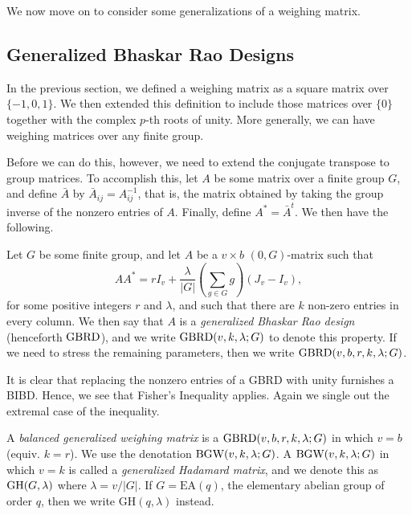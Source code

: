 \documentclass[../../../main]{subfiles}
\begin{document}
We now move on to consider some generalizations of a weighing matrix.

\dinkus


\subsection{Generalized Bhaskar Rao Designs}

In the previous section, we defined a weighing matrix as a square matrix over $\{-1,0,1\}$. We then extended this definition to include those matrices over $\{0\}$ together with the complex $p$-th roots of unity. More generally, we can have weighing matrices over any finite group. 

Before we can do this, however, we need to extend the conjugate transpose to group matrices. To accomplish this, let $A$ be some matrix over a finite group $G$, and define $\bar A$ by $\bar{A}_{ij}=A_{ij}^{-1}$, that is, the matrix obtained by taking the group inverse of the nonzero entries of $A$. Finally, define $A^* = \bar{A}^t$. We then have the following.

\begin{defin}\label{gbrd definition}
  Let $G$ be some finite group, and let $A$ be a $v \times b$ $(0,G)$-matrix such that
  \begin{equation}\label{gbrd-eq}
    AA^* = rI_v + \frac{\lambda}{|G|}\left(\sum_{g \in G}g\right)(J_v - I_v),
  \end{equation}
  for some positive integers $r$ and $\lambda$, and such that there are $k$ non-zero entries in every column. We then say that $A$ is a {\it generalized Bhaskar Rao design} (henceforth $\text{GBRD}$), and we write $\text{GBRD}(v,k,\lambda;G)$ to denote this property. If we need to stress the remaining parameters, then we write $\text{GBRD}(v,b,r,k,\lambda;G)$.
\end{defin}

It is clear that replacing the nonzero entries of a GBRD with unity furnishes a
BIBD. Hence, we see that Fisher's Inequality applies. Again we single out the
extremal case of the inequality.

\begin{defin}\label{bgw definition}
  A {\it balanced generalized weighing matrix} is a $\text{GBRD}(v,b,r,k,\lambda;G)$
  in which $v = b$ (equiv. $k = r$). We use the denotation
  $\text{BGW}(v,k,\lambda;G)$. A $\text{BGW}(v,k,\lambda;G)$ in which $v = k$ is called a
  {\it generalized Hadamard matrix}, and we denote this as $\text{GH}(G,\lambda)$
  where $\lambda = v/|G|$. If $G = \mathrm{EA}(q)$, the elementary abelian group
   of order $q$, then we write $\mathrm{GH}(q,\lambda)$ instead.
\end{defin}
\end{document}
